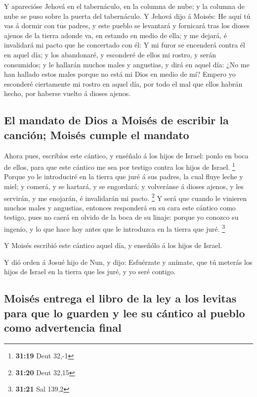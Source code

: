  Y aparecióse Jehová en el tabernáculo, en la columna de
nube; y la columna de nube se puso sobre la puerta del tabernáculo.
 Y Jehová dijo á Moisés: He aquí tú vas á dormir con tus
padres, y este pueblo se levantará y fornicará tras los dioses ajenos de
la tierra adonde va, en estando en medio de ella; y me dejará, é
invalidará mi pacto que he concertado con él:  Y mi furor
se encenderá contra él en aquel día; y los abandonaré, y esconderé de
ellos mi rostro, y serán consumidos; y le hallarán muchos males y
angustias, y dirá en aquel día: ¿No me han hallado estos males porque no
está mi Dios en medio de mí?  Empero yo esconderé
ciertamente mi rostro en aquel día, por todo el mal que ellos habrán
hecho, por haberse vuelto á dioses ajenos.

\hypertarget{el-mandato-de-dios-a-moisuxe9s-de-escribir-la-canciuxf3n-moisuxe9s-cumple-el-mandato}{%
\subsection{El mandato de Dios a Moisés de escribir la canción; Moisés
cumple el
mandato}\label{el-mandato-de-dios-a-moisuxe9s-de-escribir-la-canciuxf3n-moisuxe9s-cumple-el-mandato}}

 Ahora pues, escribíos este cántico, y enséñalo á los hijos
de Israel: ponlo en boca de ellos, para que este cántico me sea por
testigo contra los hijos de Israel. \footnote{\textbf{31:19} Deut 32,-1}
 Porque yo le introduciré en la tierra que juré á sus
padres, la cual fluye leche y miel; y comerá, y se hartará, y se
engordará: y volveránse á dioses ajenos, y les servirán, y me enojarán,
é invalidarán mi pacto. \footnote{\textbf{31:20} Deut 32,15}
 Y será que cuando le vinieren muchos males y angustias,
entonces responderá en su cara este cántico como testigo, pues no caerá
en olvido de la boca de su linaje: porque yo conozco su ingenio, y lo
que hace hoy antes que le introduzca en la tierra que juré. \footnote{\textbf{31:21}
  Sal 139,2}

 Y Moisés escribió este cántico aquel día, y enseñólo á los
hijos de Israel.

 Y dió orden á Josué hijo de Nun, y dijo: Esfuérzate y
anímate, que tú meterás los hijos de Israel en la tierra que les juré, y
yo seré contigo.

\hypertarget{moisuxe9s-entrega-el-libro-de-la-ley-a-los-levitas-para-que-lo-guarden-y-lee-su-cuxe1ntico-al-pueblo-como-advertencia-final}{%
\subsection{Moisés entrega el libro de la ley a los levitas para que lo
guarden y lee su cántico al pueblo como advertencia
final}\label{moisuxe9s-entrega-el-libro-de-la-ley-a-los-levitas-para-que-lo-guarden-y-lee-su-cuxe1ntico-al-pueblo-como-advertencia-final}}

